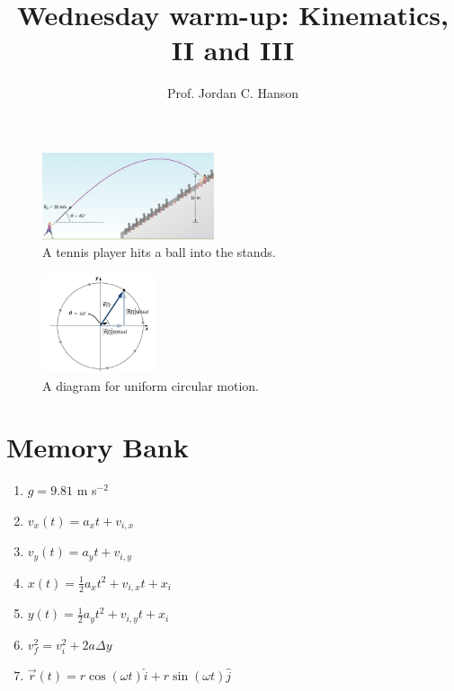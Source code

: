 \documentclass{article}
\begin{document}
\twocolumn

\title{Wednesday warm-up: Kinematics, II and III}
\author{Prof. Jordan C. Hanson}

\maketitle

\begin{figure}
\centering
\includegraphics[width=0.45\textwidth]{figures/tennis.png}
\caption{\label{fig:1} A tennis player hits a ball into the stands.}
\end{figure}

\begin{figure}
\centering
\includegraphics[width=0.3\textwidth]{figures/circular.png}
\caption{\label{fig:2} A diagram for uniform circular motion.}
\end{figure}

\section{Memory Bank}

\begin{enumerate}
\item $g = 9.81$ m s$^{-2}$
\item $v_x(t) = a_x t + v_{i,x}$
\item $v_y(t) = a_y t + v_{i,y}$
\item $x(t) = \frac{1}{2}a_x t^2 + v_{i,x} t + x_{i}$
\item $y(t) = \frac{1}{2}a_y t^2 + v_{i,y} t + x_{i}$
\item $v_f^2 = v_i^2 + 2a\Delta y$
\item $\vec{r}(t) = r \cos(\omega t) \hat{i} + r \sin(\omega t) \hat{j}$
\end{enumerate}
\end{document}
